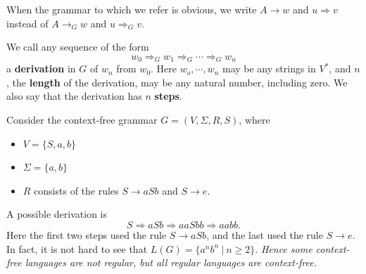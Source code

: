 \noindent When the grammar to which we refer is obvious, we write $A \to w$ and $u \Rightarrow v$ instead of $A \to_G w$ and $u \Rightarrow_G v$.

We call any sequence of the form
\begin{equation*}
  w_0 \Rightarrow_G w_1 \Rightarrow_G \cdots \Rightarrow_G w_n
\end{equation*}
a \textbf{derivation} in $G$ of $w_n$ from $w_0$. Here $w_o, \cdots, w_n$ may be any strings in $V^*$, and $n$, the \textbf{length} of the derivation, may be any natural number, including zero. We also say that the derivation has $n$ \textbf{steps}. 

\begin{example_break}{}
  Consider the context-free grammar $G = (V, \Sigma, R, S)$, where
  \begin{itemize}
    \item $V = \{ S, a, b \}$
    \item $\Sigma = \{ a, b \}$
    \item $R$ consists of the rules $S \to aSb$ and $S \to e$.
  \end{itemize}
  A possible derivation is
  \begin{equation*}
    S \Rightarrow aSb \Rightarrow aaSbb \Rightarrow aabb.
  \end{equation*}
  Here the first two steps used the rule $S \to aSb$, and the last used the rule $S \to e$. In fact, it is not hard to see that $L(G) = \{ a^nb^n\ |\ n \geq 2 \}$. \textit{Hence some context-free languages are not regular, but all regular languages are context-free.}
\end{example_break}


